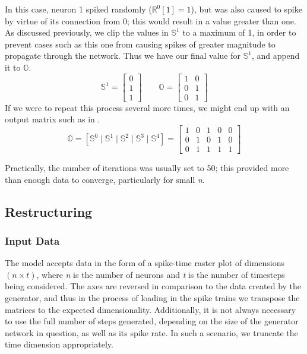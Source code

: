 In this case, neuron 1 spiked randomly ($\mathbb{R}^0[1] = 1$), but was also 
caused to spike by virtue of its connection from 0; this would result in a value 
greater than one. As discussed previously, we clip the values in $\mathbb{S}^1$ 
to a maximum of 1, in order to prevent cases such as this one from causing 
spikes of greater magnitude to propagate through the network.  Thus we have our 
final value for $\mathbb{S}^1$, and append it to $\mathbb{O}$.
\[
	\mathbb{S}^1 = \begin{bmatrix} 0 \\ 1 \\ 1 \end{bmatrix} \qquad
	\mathbb{O} = \begin{bmatrix}
		1 & 0\\
		0 & 1\\
		0 & 1 \end{bmatrix}
\]
If we were to repeat this process several more times, we might end up with an 
output matrix such as in .
{\begin{equation*}
	\mathbb{O} = \left[ \mathbb{S}^0 \mid
		\mathbb{S}^1 \mid \mathbb{S}^2 \mid \mathbb{S}^3 \mid \mathbb{S}^4 
	\right] = \begin{bmatrix}
		1 & 0 & 1 & 0 & 0\\
		0 & 1 & 0 & 1 & 0\\
		0 & 1 & 1 & 1 & 1
	\end{bmatrix}
	\label{fig:exoutput}
\end{equation*}
\captionsetup{width=.85\linewidth}
	\vspace{-8pt}
}

Practically, the number of iterations was usually set to 50; this provided more 
than enough data to converge, particularly for small \textit{n}.


\subsection{Restructuring}
\label{subsec:restructuring}

\subsubsection{Input Data}
The model accepts data in the form of a spike-time raster plot of dimensions $(n 
\times t)$, where \textit{n} is the number of neurons and \textit{t} is the 
number of timesteps being considered. The axes are reversed in comparison to the 
data created by the generator, and thus in the process of loading in the spike 
trains we transpose the matrices to the expected dimensionality. Additionally, 
it is not always necessary to use the full number of steps generated, depending 
on the size of the generator network in question, as well as its spike rate. In 
such a scenario, we truncate the time dimension appropriately.

